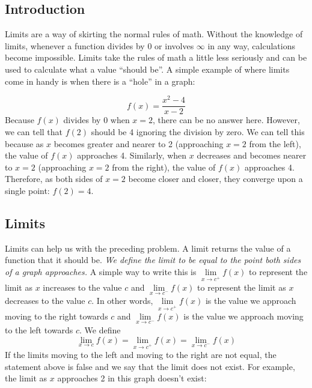 \documentclass[../main.tex]{subfiles}
\begin{document}
\subsection{Introduction} Limits are a way of skirting the normal rules of math. Without the knowledge of limits, whenever a function divides by 0 or involves $\infty$ in any way, calculations become impossible. Limits take the rules of math a little less seriously and can be used to calculate what a value ``should be''. A simple example of where limits come in handy is when there is a ``hole'' in a graph:
\begin{center}
\end{center}
$$f(x)=\frac{x^2-4}{x-2}$$
Because $f(x)$ divides by 0 when $x=2$, there can be no answer here. However, we can tell that $f(2)$ should be 4 ignoring the division by zero. We can tell this because as $x$ becomes greater and nearer to 2 (approaching $x=2$ from the left), the value of $f(x)$ approaches 4. Similarly, when $x$ decreases and becomes nearer to $x=2$ (approaching $x=2$ from the right), the value of $f(x)$ approaches 4. Therefore, as both sides of $x=2$ become closer and closer, they converge upon a single point: $f(2)=4$.
\subsection{Limits} Limits can help us with the preceding problem. A limit returns the value of a function that it should be. \textit{We define the limit to be equal to the point both sides of a graph approaches.} A simple way to write this is $\lim\limits_{x\to c^{+}}f(x)$ to represent the limit as $x$ increases to the value $c$ and $\lim\limits_{x\to c^{-}}f(x)$ to represent the limit as $x$ decreases to the value $c$. In other words, $\lim\limits_{x\to c^{+}}f(x)$ is the value we approach moving to the right towards $c$ and $\lim\limits_{x\to c^{-}}f(x)$ is the value we approach moving to the left towards $c$. We define $$\lim\limits_{x\to c} f(x)= \lim\limits_{x\to c^{+}} f(x)=\lim\limits_{x\to c^{-}}f(x)$$ If the limits moving to the left and moving to the right are not equal, the statement above is false and we say that the limit does not exist. For example, the limit as $x$ approaches 2 in this graph doesn't exist:
\begin{center}
\end{center}
\end{document}
